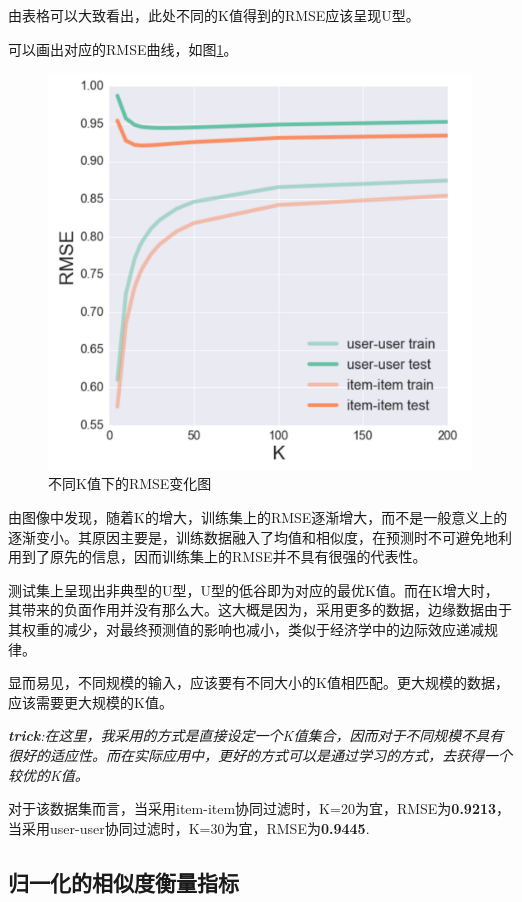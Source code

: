 \documentclass[utf8, a4paper, 11pt, onecolumn]{ctexart}
\begin{document}
\begin{spacing}{1.25}
由表格可以大致看出，此处不同的K值得到的RMSE应该呈现U型。

可以画出对应的RMSE曲线，如图\ref{k-figure}。

\begin{figure}[h]
	\centering
	\includegraphics[width=0.8\linewidth]{k-figure.png}
	\caption{不同K值下的RMSE变化图}
	\label{k-figure}
\end{figure}

由图像中发现，随着K的增大，训练集上的RMSE逐渐增大，而不是一般意义上的逐渐变小。其原因主要是，训练数据融入了均值和相似度，在预测时不可避免地利用到了原先的信息，因而训练集上的RMSE并不具有很强的代表性。

测试集上呈现出非典型的U型，U型的低谷即为对应的最优K值。而在K增大时，其带来的负面作用并没有那么大。这大概是因为，采用更多的数据，边缘数据由于其权重的减少，对最终预测值的影响也减小，类似于经济学中的边际效应递减规律。

显而易见，不同规模的输入，应该要有不同大小的K值相匹配。更大规模的数据，应该需要更大规模的K值。

\textit{\textbf{trick}:在这里，我采用的方式是直接设定一个K值集合，因而对于不同规模不具有很好的适应性。而在实际应用中，更好的方式可以是通过学习的方式，去获得一个较优的K值。}

对于该数据集而言，当采用item-item协同过滤时，K=20为宜，RMSE为\textbf{0.9213}，当采用user-user协同过滤时，K=30为宜，RMSE为\textbf{0.9445}.

\subsection{归一化的相似度衡量指标}


\end{spacing}
\end{document}
